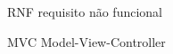 \begin{siglas}
  \item[RNF] requisito não funcional
  \item[MVC] Model-View-Controller
\end{siglas}
